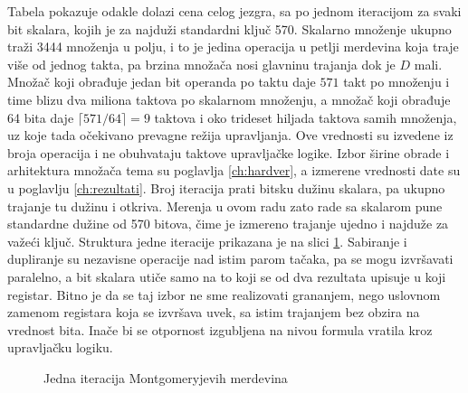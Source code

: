 Tabela pokazuje odakle dolazi cena celog jezgra, sa po jednom iteracijom za svaki bit skalara, kojih je za najduži standardni ključ 570. Skalarno množenje ukupno traži 3444 množenja u polju, i to je jedina operacija u petlji merdevina koja traje više od jednog takta, pa brzina množača nosi glavninu trajanja dok je $D$ mali. Množač koji obrađuje jedan bit operanda po taktu daje $571$ takt po množenju i time blizu dva miliona taktova po skalarnom množenju, a množač koji obrađuje 64 bita daje $\lceil 571/64 \rceil = 9$ taktova i oko trideset hiljada taktova samih množenja, uz koje tada očekivano prevagne režija upravljanja. Ove vrednosti su izvedene iz broja operacija i ne obuhvataju taktove upravljačke logike. Izbor širine obrade i arhitektura množača tema su poglavlja \ref{ch:hardver}, a izmerene vrednosti date su u poglavlju \ref{ch:rezultati}. Broj iteracija prati bitsku dužinu skalara, pa ukupno trajanje tu dužinu i otkriva. Merenja u ovom radu zato rade sa skalarom pune standardne dužine od 570 bitova, čime je izmereno trajanje ujedno i najduže za važeći ključ.
\smallbreak
Struktura jedne iteracije prikazana je na slici \ref{fig:ladder_korak}. Sabiranje i dupliranje su nezavisne operacije nad istim parom tačaka, pa se mogu izvršavati paralelno, a bit skalara utiče samo na to koji se od dva rezultata upisuje u koji registar. Bitno je da se taj izbor ne sme realizovati grananjem, nego uslovnom zamenom registara koja se izvršava uvek, sa istim trajanjem bez obzira na vrednost bita. Inače bi se otpornost izgubljena na nivou formula vratila kroz upravljačku logiku.

\begin{figure}[H]
\centering
{}
\caption{Jedna iteracija Montgomeryjevih merdevina}
\label{fig:ladder_korak}
\end{figure}

